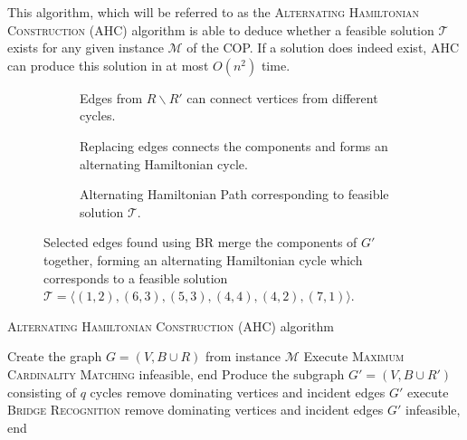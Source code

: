 \documentclass[oribibl]{llncs}
\begin{document}
This algorithm, which will be referred to as the \textsc{Alternating Hamiltonian Construction} (AHC) algorithm is able to deduce whether a feasible solution $\mathcal{T}$ exists for any given instance $\mathcal{M}$ of the COP. If a solution does indeed exist, AHC can produce this solution in at most $O(n^2)$ time.

\begin{figure}	
	\centering
	\begin{subfigure}[H]{0.7\textwidth}
		
		\caption{Edges from $R\backslash R'$ can connect vertices from different cycles.}	
		\label{fig:mpsconnect} \vspace{5mm}
	\end{subfigure}
	\begin{subfigure}[H]{0.7\textwidth}
		
		\caption{Replacing edges connects the components and forms an alternating Hamiltonian cycle.}	
		\label{fig:mpscycle} \vspace{5mm}
	\end{subfigure}
	\begin{subfigure}[H]{0.8\textwidth}
		
		\caption{Alternating Hamiltonian Path corresponding to feasible solution $\mathcal{T}$.}	
		\label{fig:mpspath}
	\end{subfigure}
	\caption{Selected edges found using BR merge the components of $G'$ together, forming an alternating Hamiltonian cycle which corresponds to a feasible solution $\mathcal{T} = \langle(1,2), (6,3), (5,3), (4,4), (4,2), (7,1) \rangle$.}
	\label{fig:connect/cycle}
\end{figure}

\begin{algorithm}[h]
\caption{\textsc{Alternating Hamiltonian Construction} (AHC) algorithm}
\label{alg:ahca}
\begin{algorithmic}[1]
	\State Create the graph $G = (V, B \cup R)$ from instance $\mathcal{M}$
	\State Execute \textsc{Maximum Cardinality Matching}
		\State infeasible, end
	\EndIf
	\State Produce the subgraph $G' = (V, B \cup R')$ consisting of $q$ cycles
		\State remove dominating vertices and incident edges
		\Return $G'$
	\Else
		\State execute \textsc{Bridge Recognition}
			\State remove dominating vertices and incident edges
			\Return $G'$
		\Else
			\State infeasible, end	
		\EndIf	
	\EndIf
\end{algorithmic}	
\end{algorithm}
\end{document}
